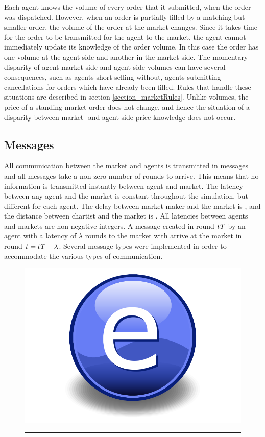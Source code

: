 Each agent knows the volume of every order that it submitted, when the order was dispatched. However, when an order is partially filled by a matching but smaller order, the volume of the order at the market changes. Since it takes time for the order to be transmitted for the agent to the market, the agent cannot immediately update its knowledge of the order volume. In this case the order has one volume at the agent side and another in the market side. The momentary disparity of agent market side and agent side volumes can have several consequences, such as agents short-selling without, agents submitting cancellations for orders which have already been filled. Rules that handle these situations are described in section \ref{section_marketRules}. Unlike volumes, the price of a standing market order does not change, and hence the situation of a disparity between market- and agent-side price knowledge does not occur.





\subsection{Messages}
All communication between the market and agents is transmitted in messages and all messages take a non-zero number of rounds to arrive. This means that no information is transmitted instantly between agent and market. The latency between any agent and the market is constant throughout the simulation, but different for each agent. The delay between market maker  and the market is , and the distance between chartist  and the market is . All latencies between agents and markets are non-negative integers. A message created in round $t_{}{T}$ by an agent with a latency of $\lambda$ rounds to the market with arrive at the market in round $t_{} = t_{}{T} + \lambda$. Several message types were implemented in order to accommodate the various types of communication.

\begin{figure}[htbp]
	\centering
		\includegraphics{Figures/Electron.pdf}
		\rule{35em}{0.5pt}
	\caption{}
	\label{fig:information_exchange}
\end{figure}


